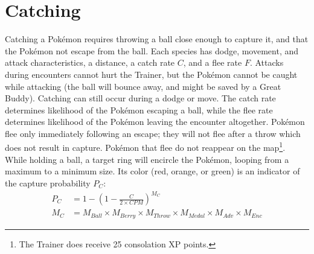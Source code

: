 \section{Catching\label{sec:catch}}
Catching a Pokémon requires throwing a ball close enough to capture it,
 and that the Pokémon not escape from the ball.
Each species has dodge, movement, and attack characteristics, a distance, a catch rate $C$, and a flee rate $F$.
Attacks during encounters cannot hurt the Trainer, but the Pokémon cannot be caught
  while attacking (the ball will bounce away, and might be saved by a Great Buddy).
Catching can still occur during a dodge or move.
The catch rate determines likelihood of the Pokémon escaping a ball,
  while the flee rate determines likelihood of the Pokémon leaving the encounter altogether.
Pokémon flee only immediately following an escape; they will not flee after a throw which
  does not result in capture.
Pokémon that flee do not reappear on the map\footnote{The Trainer does receive 25 consolation XP points.}.
While holding a ball, a target ring will encircle the Pokémon, looping from a maximum to a minimum size.
Its color (red, orange, or green) is an indicator of the capture probability $P_C$:
\begin{align*}
  P_C &= 1-\left(1 - \frac{C}{2\times{}CPM}\right)^{M_C}\\
  M_C &= M_{Ball} \times M_{Berry} \times M_{Throw} \times M_{Medal} \times M_{Adv} \times M_{Enc}
\end{align*}
